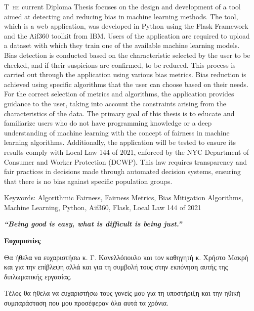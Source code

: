 \documentclass[12pt,twoside]{article}
\newcommand{\en}{\selectlanguage{english}}
\newcommand{\gr}{\selectlanguage{greek}}
\begin{document}
\lettrine [loversize = 0.03] {\en T} {\ he} current Diploma Thesis focuses on the design and development of a tool aimed at detecting and reducing bias in machine learning methods. The tool, which is a web application, was developed in Python using the Flask Framework and the Aif360 toolkit from IBM. Users of the application are required to upload a dataset with which they train one of the available machine learning models. Bias detection is conducted based on the characteristic selected by the user to be checked, and if their suspicions are confirmed, to be reduced. This process is carried out through the application using various bias metrics. Bias reduction is achieved using specific algorithms that the user can choose based on their needs. For the correct selection of metrics and algorithms, the application provides guidance to the user, taking into account the constraints arising from the characteristics of the data. The primary goal of this thesis is to educate and familiarize users who do not have programming knowledge or a deep understanding of machine learning with the concept of fairness in machine learning algorithms. Additionally, the application will be tested to ensure its results comply with Local Law 144 of 2021, enforced by the NYC Department of Consumer and Worker Protection (DCWP). This law requires transparency and fair practices in decisions made through automated decision systems, ensuring that there is no bias against specific population groups.
\\
\par{\large{\en Keywords: Algorithmic Fairness, Fairness Metrics, Bias Mitigation Algorithms, Machine Learning, Python, Aif360, Flask, Local Law 144 of 2021}}

\newpage\null
\thispagestyle{plain}
\vspace*{\fill}
\begin{center}
\begin{minipage}{.6\textwidth}
\centering \textbf{\en\textit{ “Being good is easy, what is difficult is being just.”}
}%
\end{minipage}
\end{center}
\vfill

\newpage
\thispagestyle{plain}
\par{\Large{ \textbf{\gr Ευχαριστίες}}}
\par{}
\gr Θα ήθελα να ευχαριστήσω κ. Γ. Κανελλόπουλο και τον καθηγητή  κ. Χρήστο Μακρή  και  για την επίβλεψη  αλλά και για τη συμβολή τους στην εκπόνηση αυτής της διπλωματικής εργασίας.
\par{}
Τέλος θα ήθελα να ευχαριστήσω τους γονείς μου για τη υποστήριξη και την ηθική συμπαράσταση που μου προσέφεραν όλα αυτά τα χρόνια.
\end{document}
